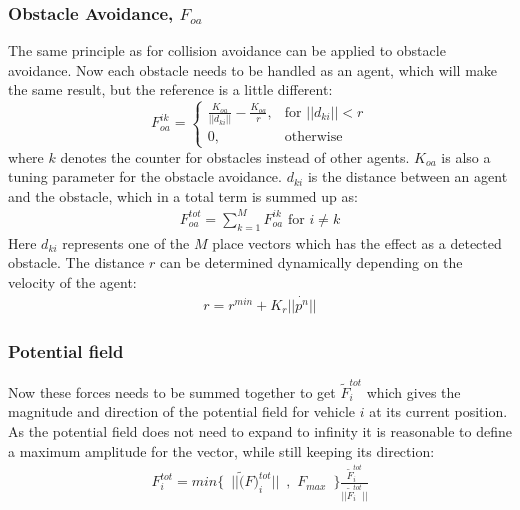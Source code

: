 \subsubsection{Obstacle Avoidance, $F_{oa}$}
The same principle as for collision avoidance can be applied to obstacle avoidance. Now each obstacle needs to be handled as an agent, which will make the same result, but the reference is a little different:
\[
    F_{oa}^{ik}= 
\begin{cases}
    \frac{K_{oa}}{||d_{ki}||}-\frac{K_{oa}}{r},& \text{for } ||d_{ki}||<r\\
    0,              & \text{otherwise}
\end{cases}
\]
where $k$ denotes the counter for obstacles instead of other agents. $K_{oa}$ is also a tuning parameter for the obstacle avoidance. $d_{ki}$ is the distance between an agent and the obstacle, which in a total term is summed up as:
\begin{align}
F_{oa}^{tot} = \sum\limits_{k=1}^MF_{oa}^{ik} \text{ for } i\neq k
\end{align}
Here $d_{ki}$ represents one of the $M$ place vectors which has the effect as a detected obstacle.
The distance $r$ can be determined dynamically depending on the velocity of the agent:
\begin{align}
r = r^{min} + K_r||\dot{p^n}||
\end{align}

\subsubsection{Potential field}
Now these forces needs to be summed together to get $\tilde{F}_i^{tot}$ which gives the magnitude and direction of the potential field for vehicle $i$ at its current position. As the potential field does not need to expand to infinity it is reasonable to define a maximum amplitude for the vector, while still keeping its direction:
\begin{align}
F_i^{tot} = min\{\,\,\,||\tilde(F)_i^{tot}||\,\,\,,\,\,F_{max}\,\,\,\}\frac{\tilde{F}_i^{tot}}{||\tilde{F}_i^{tot}||}
\end{align}





